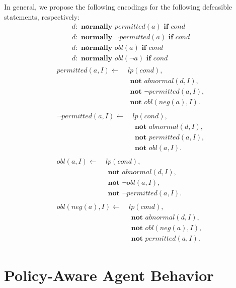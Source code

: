 In general, we propose the following encodings for the following defeasible statements, respectively:
\begin{gather}
    d: \textbf{ normally } permitted(a) \textbf{ if } cond \\
    d: \textbf{ normally } \neg permitted(a) \textbf{ if } cond \\
    d: \textbf{ normally } obl(a) \textbf{ if } cond \\
    d: \textbf{ normally } obl(\neg a) \textbf{ if } cond
\end{gather}
\begin{gather}
\begin{split}
    permitted(a, I) \leftarrow \
        & lp(cond), \\
        & \textbf{ not } abnormal(d, I), \\
        & \textbf{ not } \neg permitted(a, I), \\
        & \textbf{ not } obl(neg(a), I).
\end{split} \\
\begin{split}
    \neg permitted(a, I) \leftarrow \
        & lp(cond), \\
        & \textbf{ not } abnormal(d, I), \\
        & \textbf{ not } permitted(a, I), \\
        & \textbf{ not } obl(a, I).
\end{split} \\
\begin{split}
    obl(a, I) \leftarrow \
        & lp(cond), \\
        & \textbf{ not } abnormal(d, I), \\
        & \textbf{ not } \neg obl(a, I), \\
        & \textbf{ not } \neg permitted(a, I).
\end{split} \\
\begin{split}
    obl(neg(a), I) \leftarrow \
        & lp(cond), \\
        & \textbf{ not } abnormal(d, I), \\
        & \textbf{ not } obl(neg(a), I), \\
        & \textbf{ not } permitted(a, I).
\end{split}
\end{gather}

\section{Policy-Aware Agent Behavior}

